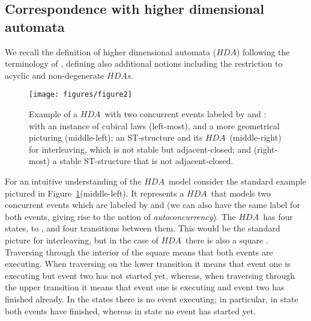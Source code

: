 \documentclass[submission,copyright,creativecommons]{eptcs}
\newcommand{\cp}[1]{}
\newcounter{case}
\newcommand\HDA{\ensuremath{\mathit{HDA}}}
\newcommand\HDAs{\ensuremath{\mathit{HDAs}}}
\newcommand\allST{\ensuremath{\mathbb{ST}}}
\newcommand\allEv{\ensuremath{\mathbb{E}}}
\begin{document}
\cp{Can prove categorical results like equivalence of categories \allST\ and \allEv; in fact their respective sub-categories of rooted connected and adjacent-closed. Or one can look for adjoints since  and .}

\subsection{Correspondence with higher dimensional automata}

We recall the definition of higher dimensional automata (\HDA) following the terminology of \cite{Glabbeek06HDA,Pratt03trans_cancel}, defining also additional notions including the restriction to acyclic and non-degenerate \HDAs.


\begin{figure}[tp]
\begin{center}
\texttt{[image: figures/figure2]}
  \end{center}
\caption{Example of a \HDA\ with two concurrent events labeled by  and : with an instance of cubical laws (left-most), and a more geometrical picturing (middle-left); an ST-structure and its \HDA\ (middle-right) for interleaving, which is not stable but adjacent-closed; and (right-most) a stable ST-structure that is not adjacent-closed.}
\label{fig_ex_hda}
\end{figure}

For an intuitive understanding of the \HDA\ model consider the standard example \cite{Pratt03trans_cancel,Glabbeek06HDA} pictured in Figure~\ref{fig_ex_hda}(middle-left). It represents a \HDA\ that models two concurrent events which are labeled by  and  (we can also have the same label  for both events, giving rise to the notion of \emph{autoconcurrency}). The \HDA\ has four states,  to , and four transitions between them. This would be the standard picture for interleaving, but in the case of \HDA\ there is also a square . Traversing through the interior of the square means that both events are executing. When traversing on the lower transition it means that event one is executing but event two has not started yet, whereas, when traversing through the upper transition it means that event one is executing and event two has finished already. In the states there is no event executing; in particular, in state  both events have finished, whereas in state  no event has started yet.
\end{document}
